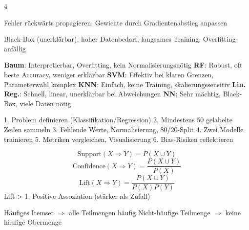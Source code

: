 \begin{landscape}
\begin{multicols*}{4}
		\begin{cheatSheetBox}[title=Backpropagation]
			Fehler rückwärts propagieren, Gewichte durch Gradientenabstieg anpassen
		\end{cheatSheetBox}

		\begin{cheatSheetBox}[title=NN-Grenzen]
			Black-Box (unerklärbar), hoher Datenbedarf, langsames Training, Overfitting-anfällig
		\end{cheatSheetBox}


		\begin{cheatSheetBox}[title=Algorithmen-Vergleich]
			\textbf{Baum}: Interpretierbar, Overfitting, kein Normalisierungsnötig
			\textbf{RF}: Robust, oft beste Accuracy, weniger erklärbar
			\textbf{SVM}: Effektiv bei klaren Grenzen, Parameterwahl komplex
			\textbf{KNN}: Einfach, keine Training, skalierungssensitiv
			\textbf{Lin. Reg.}: Schnell, linear, unerklärbar bei Abweichungen
			\textbf{NN}: Sehr mächtig, Black-Box, viele Daten nötig
		\end{cheatSheetBox}


		\begin{cheatSheetBox}[title=Schritte]
			1. Problem definieren (Klassifikation/Regression)
			2. Mindestens 50 gelabelte Zeilen sammeln
			3. Fehlende Werte, Normalisierung, 80/20-Split
			4. Zwei Modelle trainieren
			5. Metriken vergleichen, Visualisierung
			6. Bias-Risiken reflektieren
		\end{cheatSheetBox}


		\begin{cheatSheetBox}[title=Zentrale Kennzahlen]
			\[
				\text{Support}(X \Rightarrow Y) = P(X \cup Y)
			\]
			\[
				\text{Confidence}(X \Rightarrow Y) = \frac{P(X \cup Y)}{P(X)}
			\]
			\[
				\text{Lift}(X \Rightarrow Y) = \frac{P(X \cup Y)}{P(X)P(Y)}
			\]
			Lift > 1: Positive Assoziation (stärker als Zufall)
		\end{cheatSheetBox}

		\begin{cheatSheetBox}[title=Apriori-Prinzip]
			Häufiges Itemset $\Rightarrow$ alle Teilmengen häufig
			Nicht-häufige Teilmenge $\Rightarrow$ keine häufige Obermenge
		\end{cheatSheetBox}


\end{multicols*}
\end{landscape}
